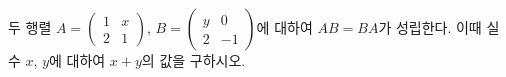 \hspace*{2mm}\begin{minipage}[t]{\dimexpr\linewidth-2mm\relax}\vspace{0pt}
두 행렬 $A=\begin{pmatrix} 1 & x \\ 2 & 1 \end{pmatrix}$, $B=\begin{pmatrix} y & 0 \\ 2 & -1 \end{pmatrix}$에 대하여 $AB=BA$가 성립한다. 이때 실수 $x$, $y$에 대하여 $x+y$의 값을 구하시오.\end{minipage}
